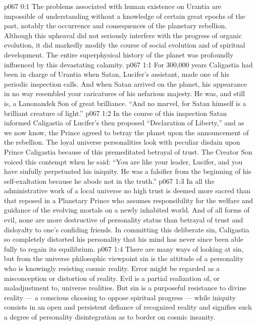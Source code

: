 \author{Melchizedek}
\vs p067 0:1 The problems associated with human existence on Urantia are impossible of understanding without a knowledge of certain great epochs of the past, notably the occurrence and consequences of the planetary rebellion. Although this upheaval did not seriously interfere with the progress of organic evolution, it did markedly modify the course of social evolution and of spiritual development. The entire superphysical history of the planet was profoundly influenced by this devastating calamity.
\vs p067 1:1 For 300,000 years Caligastia had been in charge of Urantia when Satan, Lucifer’s assistant, made one of his periodic inspection calls. And when Satan arrived on the planet, his appearance in no way resembled your caricatures of his nefarious majesty. He was, and still is, a Lanonandek Son of great brilliance. “And no marvel, for Satan himself is a brilliant creature of light.”
\vs p067 1:2 In the course of this inspection Satan informed Caligastia of Lucifer’s then proposed “Declaration of Liberty,” and as we now know, the Prince agreed to betray the planet upon the announcement of the rebellion. The loyal universe personalities look with peculiar disdain upon Prince Caligastia because of this premeditated betrayal of trust. The Creator Son voiced this contempt when he said: “You are like your leader, Lucifer, and you have sinfully perpetuated his iniquity. He was a falsifier from the beginning of his self\hyp{}exaltation because he abode not in the truth.”
\vs p067 1:3 In all the administrative work of a local universe no high trust is deemed more sacred than that reposed in a Planetary Prince who assumes responsibility for the welfare and guidance of the evolving mortals on a newly inhabited world. And of all forms of evil, none are more destructive of personality status than betrayal of trust and disloyalty to one’s confiding friends. In committing this deliberate sin, Caligastia so completely distorted his personality that his mind has never since been able fully to regain its equilibrium.
\vs p067 1:4 \pc There are many ways of looking at sin, but from the universe philosophic viewpoint sin is the attitude of a personality who is knowingly resisting cosmic reality. Error might be regarded as a misconception or distortion of reality. Evil is a partial realization of, or maladjustment to, universe realities. But sin is a purposeful resistance to divine reality --- a conscious choosing to oppose spiritual progress --- while iniquity consists in an open and persistent defiance of recognized reality and signifies such a degree of personality disintegration as to border on cosmic insanity.
